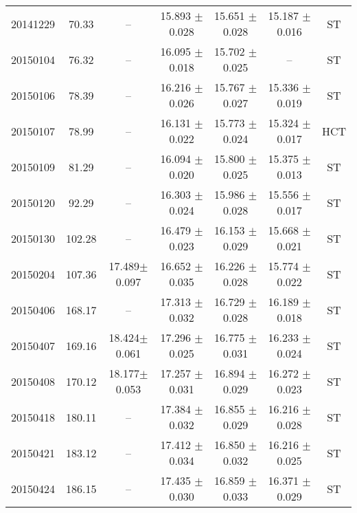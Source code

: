 \begin{table*}
\begin{tabular}{c c c c c c c}
20141229         &  70.33   &      --                    & 15.893 $\pm$ 	0.028    &  15.651 $\pm$  0.028       &  15.187 $\pm$   0.016 & ST\\
20150104         &  76.32   &      --                    & 16.095 $\pm$ 	0.018    &  15.702 $\pm$  0.025       &  --                   & ST\\
20150106         &  78.39   &      --                    & 16.216 $\pm$ 	0.026    &  15.767 $\pm$  0.027       &  15.336 $\pm$ 	0.019 & ST\\  
20150107         &  78.99   &      --                    & 16.131 $\pm$ 	0.022    &  15.773 $\pm$  0.024       &  15.324 $\pm$ 	0.017 & HCT\\          
20150109         &  81.29   &      --                    & 16.094 $\pm$ 	0.020    &  15.800 $\pm$  0.025       &  15.375 $\pm$ 	0.013 & ST\\            
20150120         &  92.29   &      --                    & 16.303 $\pm$ 	0.024    &  15.986 $\pm$  0.028       &  15.556 $\pm$ 	0.017 & ST\\           
20150130         &  102.28  &       --                   & 16.479 $\pm$ 	0.023    &  16.153 $\pm$  0.029       &  15.668 $\pm$ 	0.021 & ST\\           
20150204         &  107.36  &   17.489$\pm$ 0.097        & 16.652 $\pm$ 	0.035    &  16.226 $\pm$  0.028       &  15.774 $\pm$ 	0.022 & ST\\     
20150406         &  168.17  &       --                   & 17.313 $\pm$ 	0.032    &  16.729 $\pm$  0.028       &  16.189 $\pm$ 	0.018 & ST\\     
20150407         &  169.16  &   18.424$\pm$ 0.061        & 17.296 $\pm$ 	0.025    &  16.775 $\pm$  0.031       &  16.233 $\pm$ 	0.024 & ST\\     
20150408         &  170.12  &   18.177$\pm$0.053         & 17.257 $\pm$ 	0.031    &  16.894 $\pm$  0.029       &  16.272 $\pm$   0.023 & ST\\     
20150418         &  180.11  &       --                   & 17.384 $\pm$ 	0.032    &  16.855 $\pm$  0.029       &  16.216 $\pm$ 	0.028 & ST\\  
20150421         &  183.12  &       --                   & 17.412 $\pm$ 	0.034    &  16.850 $\pm$  0.032       &  16.216 $\pm$ 	0.025 & ST\\     
20150424         &  186.15  &       --                   & 17.435 $\pm$ 	0.030    &  16.859 $\pm$  0.033       &  16.371 $\pm$ 	0.029 & ST\\     

\end{tabular}
\end{table*}
